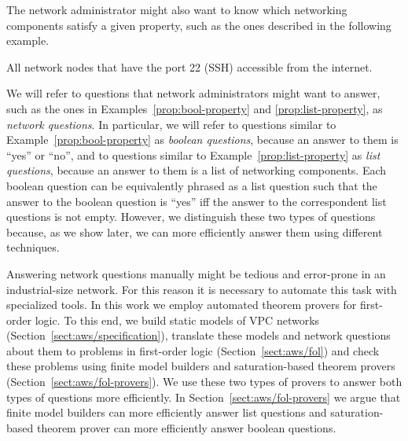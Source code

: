 The network administrator might also want to know which networking components satisfy a given property, such as the ones described in the following example.
\begin{example}\label{prop:list-property}
All network nodes that have the port 22 (SSH) accessible from the internet.
\end{example}

We will refer to questions that network administrators might want to answer, such as the ones in Examples~\ref{prop:bool-property} and \ref{prop:list-property}, as \emph{network questions}. In particular, we will refer to questions similar to Example~\ref{prop:bool-property} as \emph{boolean questions}, because an answer to them is ``yes'' or ``no'', and to questions similar to Example~\ref{prop:list-property} as \emph{list questions}, because an answer to them is a list of networking components. Each boolean question can be equivalently phrased as a list question such that the answer to the boolean question is ``yes'' iff the answer to the correspondent list questions is not empty. However, we distinguish these two types of questions because, as we show later, we can more efficiently answer them using different techniques.

Answering network questions manually might be tedious and error-prone in an industrial-size network. For this reason it is necessary to automate this task with specialized tools. In this work we employ automated theorem provers for first-order logic. To this end, we build static models of VPC networks (Section~\ref{sect:aws/specification}), translate these models and network questions about them to problems in first-order logic (Section~\ref{sect:aws/fol}) and check these problems using finite model builders and saturation-based theorem provers (Section~\ref{sect:aws/fol-provers}). We use these two types of provers to answer both types of questions more efficiently. In Section~\ref{sect:aws/fol-provers} we argue that finite model builders can more efficiently answer list questions and saturation-based theorem prover can more efficiently answer boolean questions.




